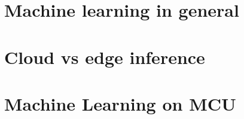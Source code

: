 \documentclass[12pt]{report}
\begin{document}
\section{Machine learning in general}

\section{Cloud vs edge inference}


\section{Machine Learning on MCU}
\end{document}
